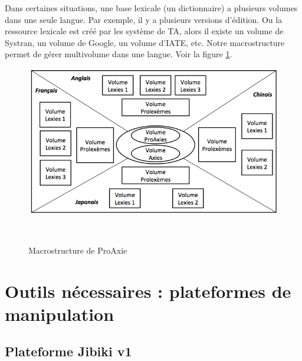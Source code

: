 \documentclass[10pt,a4paper,twoside]{article}
\begin{document}
Dans certaines situations, une base lexicale (un dictionnaire) a plusieurs volumes dans une seule langue. Par exemple, il y a plusieurs versions d’édition. Ou la ressource lexicale est créé par les système de TA, alors il existe un volume de Systran, un volume de Google, un volume d’IATE, etc. Notre macrostructure permet de gérer multivolume dans une langue. Voir la figure \ref{image-macrostructure-proaxie}.

\begin{figure}[htbp] 
\begin{center} 
\includegraphics[width=12cm]{images/proaxie.png}
\end{center} 
\caption{Macrostructure de ProAxie} \label{image-macrostructure-proaxie} \
\end{figure}

\section{Outils nécessaires : plateformes de manipulation}

\subsection{Plateforme Jibiki v1}
\end{document}
